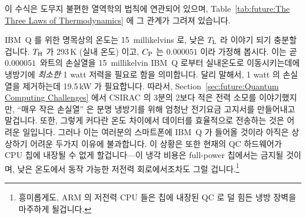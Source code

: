 이 수식은 도무지 불편한 열역학의 법칙에 연관되어 있으며,
Table~\ref{tab:future:The Three Laws of Thermodynamics} 에 그 관계가 그려져
있습니다.

IBM~Q 를 위한 명목상의 온도는 15~millikelvins 로, 낮은 $T_\mathrm{L}$ 라 이야기 되기
충분할 겁니다.
$T_\mathrm{H}$ 가 293\,K (실내 온도) 이고, $C_\mathrm{P}$ 는 $0.000051$ 이라 가정해 봅시다.
이는 곧 $0.000051$~와트의 손실열을 15~millikelvin IBM~Q 로부터 실내온도로
이동시키는데에 냉방기에 \emph{최소한} 1 watt 저력을 필요로 함을 의미합니다.
달리 말해서, 1 watt 의 손실열을 제거하는데 19.5\,kW 가 필요합니다.
따라서,
Section~\ref{sec:future:Quantum Computing Challenges} 에서 CSIRAC 의 3분의
2보다 적은 전력 소모를 이야기했지만, ``매우 작은 손실열'' 은 분명 냉방기를 위해
엄청난 전기요금 고지서를 만들어내고 말겁니다.
또한, 그렇게 커다란 온도 차이에서 데이터를 효율적으로 전송하는 것은 어려운
일입니다.
그러나 이는 여러분의 스마트폰에 IBM~Q 가 들어올 것이라 아직은 상상하기 어려운
두가지 이유에 불과합니다.
이 상황은 또한 현재의 QC 하드웨어가 CPU 칩에 내장될 수 없게 할겁니다---이 냉각
비용은 full-power 칩에서는 금지될 것이며, 낮은 온도에서 동작 가능한 저전력
회로에서조차도 그럴 겁니다.\footnote{
	흥미롭게도, ARM 의 저전력 CPU 들은 칩에 내장된 QC 로 덜 힘든 냉방
	장벽을 마주하게 될겁니다.}

